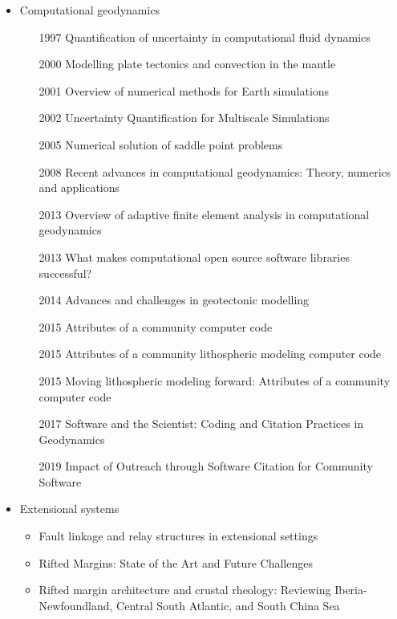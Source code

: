 \begin{itemize}
\item Computational geodynamics
   \begin{itemize}
   \item [1997] Quantification of uncertainty in computational fluid dynamics \cite{roac97}
   \item [2000] Modelling plate tectonics and convection in the mantle \cite{mogz00}
   \item [2001] Overview of numerical methods for Earth simulations \cite{momd01}
   \item [2002] Uncertainty Quantification for Multiscale Simulations \cite{degg02}
   \item [2005] Numerical solution of saddle point problems \cite{begl05}
   \item [2008] Recent advances in computational geodynamics: Theory, numerics and applications \cite{kags08}
   \item [2013] Overview of adaptive finite element analysis in computational geodynamics \cite{masm13}
   \item [2013] What makes computational open source software libraries successful? \cite{bahe13}
   \item [2014] Advances and challenges in geotectonic modelling \cite{bufy14}
   \item [2015] Attributes of a community computer code \cite{comc15}
   \item [2015] Attributes of a community lithospheric modeling computer code \cite{comc15}
   \item [2015] Moving lithospheric modeling forward: Attributes of a community computer code \cite{comc15}
   \item [2017] Software and the Scientist: Coding and Citation Practices in Geodynamics \cite{hwfs17}
   \item [2019] Impact of Outreach through Software Citation for Community Software \cite{hwpc19}
   \end{itemize}

\item Extensional systems
   \begin{itemize}
   \item Fault linkage and relay structures in extensional settings \cite{foro16}
   \item Rifted Margins: State of the Art and Future Challenges \cite{pema19}\\
   \item Rifted margin architecture and crustal rheology: Reviewing
Iberia-Newfoundland, Central South Atlantic, and South China Sea \cite{brhc17}
   \end{itemize}


\end{itemize}
